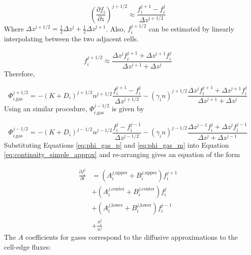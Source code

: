 $$\left( \frac{\partial f_{i}}{\partial z} \right)^{j+1/2} \approx \frac{f_i^{j+1} - f_i^{j}}{\Delta z^{j+1/2}}$$
Where $\Delta z^{j+1/2} = \frac{1}{2}\Delta z^j + \frac{1}{2} \Delta z^{j+1}$. Also, $f_{i}^{j+1/2}$ can be estimated by linearly interpolating between the two adjacent cells.

$$f_{i}^{j+1/2} \approx \frac{\Delta z^{j}f_i^{j+1} + \Delta z^{j+1} f_i^{j}}{\Delta z^{j+1}+\Delta z^{j}}$$
Therefore,

\begin{equation} \label{eq:phi_gas_p}
  \Phi_{i\text{,gas}}^{j+1/2} = - ( K + D_{i})^{j+1/2} n^{j+1/2} \frac{f_i^{j+1} - f_i^{j}}{\Delta z^{j+1/2}} - (\gamma_{i} n)^{j+1/2} \frac{\Delta z^{j}f_i^{j+1} + \Delta z^{j+1} f_i^{j}}{\Delta z^{j+1}+\Delta z^{j}}
\end{equation}
Using an similar procedure, $\Phi_{i\text{,gas}}^{j-1/2}$ is given by

\begin{equation} \label{eq:phi_gas_m}
  \Phi_{i\text{,gas}}^{j-1/2} = - ( K + D_{i})^{j-1/2} n^{j-1/2} \frac{f_i^{j} - f_i^{j-1}}{\Delta z^{j-1/2}} - (\gamma_{i} n)^{j-1/2} \frac{\Delta z^{j-1}f_i^{j} + \Delta z^{j} f_i^{j-1}}{\Delta z^{j}+\Delta z^{j-1}}
\end{equation}
Substituting Equations \eqref{eq:phi_gas_p} and \eqref{eq:phi_gas_m} into Equation \eqref{eq:continuity_simple_approx} and re-arranging gives an equation of the form

\begin{equation} \label{eq:dfdt_general}
\begin{split} 
  \frac{\partial f_{i}^j}{\partial t} &= (A_{i}^{j\text{,upper}}+ B_{i}^{j\text{,upper}}) f_{i}^{j+1} \\
  &+ (A_{i}^{j\text{,center}} + B_{i}^{j\text{,center}}) f_{i}^{j} \\
  &+ (A_{i}^{j\text{,lower}} + B_{i}^{j\text{,lower}}) f_{i}^{j-1} \\
  &+ \frac{\sigma_i^j}{n^{j}}
\end{split}
\end{equation}
The $A$ coefficients for gases correspond to the diffusive approximations to the cell-edge fluxes:

